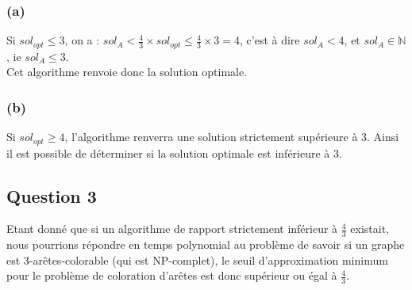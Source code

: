 \subsubsection{(a)}\label{ex11_q2_a}
Si $sol_{opt} \leq 3$, on a : $sol_A < \frac{4}{3} \times sol_{opt} \leq \frac{4}{3}
\times 3 = 4$,
c'est à dire $sol_A < 4$, et $sol_A \in \mathbb{N}$, ie $sol_A \leq 3$.\\
Cet algorithme renvoie donc la solution optimale.

\subsubsection{(b)}\label{ex11_q2_b}
Si $sol_{opt} \geq 4$, l'algorithme renverra une solution strictement supérieure à 3.
Ainsi il est possible de déterminer si la solution optimale est inférieure à 3.

\subsection{Question 3}\label{ex11_q3}
Etant donné que si un algorithme de rapport strictement inférieur à $\frac{4}{3}$
existait, nous pourrions répondre en temps polynomial au problème de savoir si un graphe est
3-arêtes-colorable (qui est NP-complet),
le seuil d'approximation minimum pour le problème de coloration d'arêtes est donc
supérieur ou égal à $\frac{4}{3}$.

